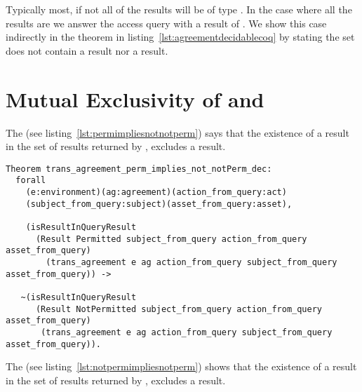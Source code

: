Typically most, if not all of the results will be of type . In the case where all the results are  we answer the access query with a result of . We show this case indirectly in the theorem in listing~\ref{lst:agreementdecidablecoq} by stating the set does not contain a  result nor a  result. 

\section{Mutual Exclusivity of  and }\label{sec:mutualexclusive}

The  (see listing~\ref{lst:permimpliesnotnotperm}) says that the existence of a  result in the set of results returned by , excludes a  result.


\begin{minipage}[c]{0.95\textwidth}
\begin{lstlisting}
Theorem trans_agreement_perm_implies_not_notPerm_dec:
  forall
    (e:environment)(ag:agreement)(action_from_query:act)
    (subject_from_query:subject)(asset_from_query:asset),

    (isResultInQueryResult 
      (Result Permitted subject_from_query action_from_query asset_from_query)
        (trans_agreement e ag action_from_query subject_from_query asset_from_query)) ->

   ~(isResultInQueryResult 
      (Result NotPermitted subject_from_query action_from_query asset_from_query)
       (trans_agreement e ag action_from_query subject_from_query asset_from_query)).
\end{lstlisting}
\end{minipage}


The   (see listing~\ref{lst:notpermimpliesnotperm}) shows that the existence of a  result in the set of results returned by , excludes a  result.

